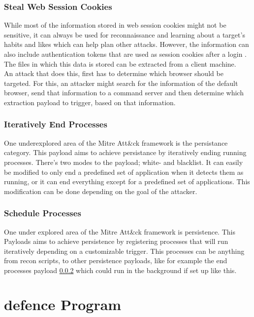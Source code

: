 \subsubsection{Steal Web Session Cookies}

While most of the information stored in web session cookies might not be sensitive, it can always be used for reconnaissance and learning about a target's habits and likes which can help plan other attacks. However, the information can also include authentication tokens that are used as session cookies after a login \cite{StealWebSession}. The files in which this data is stored can be extracted from a client machine. \\
An attack that does this, first has to determine which browser should be targeted. For this, an attacker might search for the information of the default browser, send that information to a command server and then determine which extraction payload to trigger, based on that information. 


\subsubsection{Iteratively End Processes} \label{Iteratively End Processes}

One underexplored area of the Mitre Att\&ck framework is the persistance category. This payload aims to achieve persistance by iteratively ending running processes. There's two modes to the payload; white- and blacklist. It can easily be modified to only end a predefined set of application when it detects them as running, or it can end everything except for a predefined set of applications. This modification can be done depending on the goal of the attacker. 


\subsubsection{Schedule Processes}

One under explored area of the Mitre Att\&ck framework is persistence. This Payloads aims to achieve persistence by registering processes that will run iteratively depending on a customizable trigger. This processes can be anything from recon scripts, to other persistence payloads, like for example the end processes payload \ref{Iteratively End Processes} which could run in the background if set up like this.



\section{defence Program}

